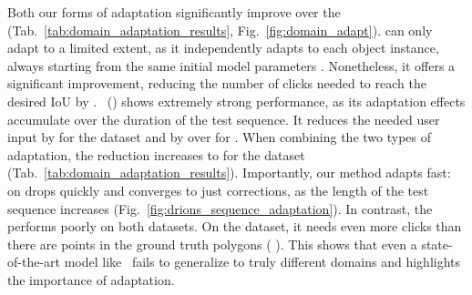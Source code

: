 Both our forms of adaptation significantly improve over the \fixedmodellong{} (Tab.~\ref{tab:domain_adaptation_results}, Fig.~\ref{fig:domain_adapt}). 
\uc \imageSGD{} can only adapt to a limited extent, as it independently adapts to each object instance, always starting from the same initial model parameters .
Nonetheless, it offers a significant improvement, reducing the number of clicks needed to reach the desired IoU by .
\uc \datasetSGD{}~(\sequenceadaptationshort{}) shows extremely strong performance, as its adaptation effects accumulate over the duration of the test sequence.
It reduces the needed user input by  for the \rooftop{} dataset and by over  for \medical{}.
When combining the two types of adaptation, the reduction increases to  for the \medical{} dataset (Tab.~\ref{tab:domain_adaptation_results}).
Importantly, our method adapts fast: on \medical{}
drops quickly and converges to just  corrections, as the length of the test sequence increases (Fig.~\ref{fig:drions_sequence_adaptation}). 
In contrast, the \fixedmodellong{} performs poorly on both datasets.
On the \rooftop{} dataset, it needs even more clicks than there are points in the ground truth polygons ( \vs {}). This shows that even a state-of-the-art model like~\cite{mahadevan18bmvc} fails to generalize to truly different domains and highlights the importance of adaptation.

